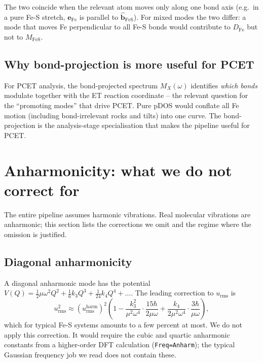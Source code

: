 \documentclass[10pt,a4paper,twoside]{article}
\newcommand{\evec}{\mathbf{e}}
\newcommand{\bhat}{\hat{\mathbf{b}}}
\newcommand{\urms}{u_{\mathrm{rms}}}
\newcommand{\fn}[1]{\texttt{#1}}
\begin{document}
The two coincide when the relevant atom moves only along one
bond axis (e.g.\ in a pure Fe-S stretch, $\evec_\text{Fe}$ is
parallel to $\bhat_\text{FeS}$). For mixed modes the two differ:
a mode that moves Fe perpendicular to all Fe-S bonds would
contribute to $D_\text{Fe}$ but not to $M_\text{FeS}$.

\subsection{Why bond-projection is more useful for PCET}

For PCET analysis, the bond-projected spectrum $M_X(\omega)$
identifies \emph{which bonds} modulate together with the ET
reaction coordinate -- the relevant question for the
``promoting modes'' that drive PCET. Pure pDOS would conflate
all Fe motion (including bond-irrelevant rocks and tilts) into
one curve. The bond-projection is the analysis-stage
specialisation that makes the pipeline useful for PCET.

\section{Anharmonicity: what we do not correct for}
\label{sec:anharmonicity}

The entire pipeline assumes harmonic vibrations. Real molecular
vibrations are anharmonic; this section lists the corrections we
omit and the regime where the omission is justified.

\subsection{Diagonal anharmonicity}

A diagonal anharmonic mode has the potential
$V(Q) = \tfrac{1}{2}\mu\omega^2 Q^2 + \tfrac{1}{6}k_3 Q^3 +
\tfrac{1}{24}k_4 Q^4 + \dots$. The leading correction to $\urms$
is
\begin{equation}
  \urms^2 \approx (\urms^\text{harm})^2
   \left(1 - \frac{k_3^2}{\mu^2\omega^4}\cdot\frac{15\hbar}{2\mu\omega}
              + \frac{k_4}{2\mu^2\omega^4}\cdot\frac{3\hbar}{\mu\omega}\right),
\end{equation}
which for typical Fe-S systems amounts to a few percent at most.
We do not apply this correction. It would require the cubic
and quartic anharmonic constants from a higher-order DFT
calculation (\fn{Freq=Anharm}); the typical Gaussian frequency
job we read does not contain these.
\end{document}
